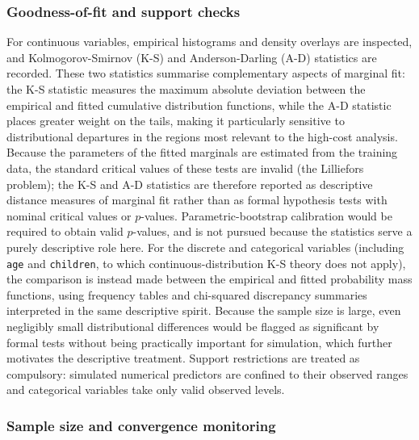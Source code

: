 \subsubsection{Goodness-of-fit and support checks}

For continuous variables, empirical histograms and density overlays are
inspected, and Kolmogorov-Smirnov (K-S) and Anderson-Darling (A-D)
statistics are recorded.  These two statistics summarise complementary
aspects of marginal fit: the K-S statistic measures the maximum
absolute deviation between the empirical and fitted cumulative distribution
functions, while the A-D statistic places greater weight on the tails,
making it particularly sensitive to distributional departures in the regions
most relevant to the high-cost analysis.  Because the parameters of the
fitted marginals are estimated from the training data, the standard
critical values of these tests are invalid (the Lilliefors problem); the
K-S and A-D statistics are therefore reported as descriptive distance
measures of marginal fit rather than as formal hypothesis tests with
nominal critical values or $p$-values.  Parametric-bootstrap calibration
would be required to obtain valid $p$-values, and is not pursued because
the statistics serve a purely descriptive role here.  For the discrete and
categorical variables (including \texttt{age} and \texttt{children}, to
which continuous-distribution K-S theory does not apply), the comparison
is instead made between the empirical and fitted probability mass
functions, using frequency tables and chi-squared discrepancy summaries
interpreted in the same descriptive spirit.  Because the sample size is
large, even negligibly small distributional differences would be flagged
as significant by formal tests without being practically important for
simulation, which further motivates the descriptive treatment.  Support
restrictions are treated as compulsory: simulated numerical predictors are
confined to their observed ranges and categorical variables take only valid
observed levels.

\subsubsection{Sample size and convergence monitoring}


